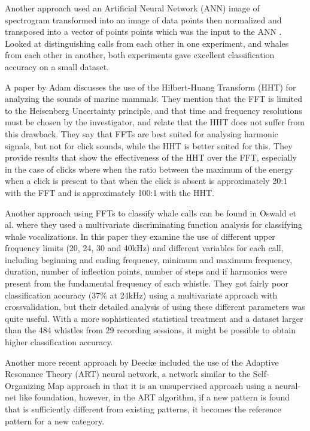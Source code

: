 Another approach used an Artificial Neural Network (ANN) image of
spectrogram transformed into an image of data points then normalized
and transposed into a vector of points points which was the input to
the ANN \cite{gaetz93}.  Looked at distinguishing calls from each
other in one experiment, and whales from each other in another, both
experiments gave excellent classification accuracy on a small dataset.

A paper by Adam \cite{adam06} discusses the use of the Hilbert-Huang
Transform (HHT) for analyzing the sounds of marine mammals.  They
mention that the FFT is limited to the Heisenberg Uncertainty
principle, and that time and frequency resolutions must be chosen by
the investigator, and relate that the HHT does not suffer from this
drawback.  They say that FFTs are best suited for analysing harmonic
signals, but not for click sounds, while the HHT is better suited for
this.  They provide results that show the effectiveness of the HHT
over the FFT, especially in the case of clicks where when the ratio
between the maximum of the energy when a click is present to that when
the click is absent is approximately 20:1 with the FFT and is
approximately 100:1 with the HHT.

Another approach using FFTs to classify whale calls can be found in
Oswald et al. \cite{oswald03} where they used a multivariate
discriminating function analysis for classifying whale vocalizations.
In this paper they examine the use of different upper frequency limits
(20, 24, 30 and 40kHz) and different variables for each call,
including beginning and ending frequency, minimum and maximum
frequency, duration, number of inflection points, number of steps and
if harmonics were present from the fundamental frequency of each
whistle.  They got fairly poor classification accuracy (37\% at 24kHz)
using a multivariate approach with crossvalidation, but their detailed
analysis of using these different parameters was quite useful.  With a
more sophisticated statistical treatment and a dataset larger than the
484 whistles from 29 recording sessions, it might be possible to obtain
higher classification accuracy.


Another more recent approach by Deecke included the use of the
Adaptive Resonance Theory (ART) neural network, a network similar to
the Self-Organizing Map approach in that it is an unsupervised
approach using a neural-net like foundation, however, in the ART
algorithm, if a new pattern is found that is sufficiently different
from existing patterns, it becomes the reference pattern for a new
category.


